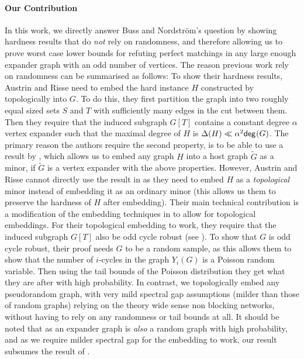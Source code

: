 \documentclass[11pt]{article}
\begin{document}
\paragraph{Our Contribution} In this work, we directly answer Buss and Nordstr{\"o}m's question by showing hardness results that do \emph{not} rely on randomness, and therefore allowing us to prove worst case lower bounds for refuting perfect matchings in any large enough expander graph with an odd number of vertices.
The reason previous work rely on randomness can be summarised as follows:
To show their hardness results, Austrin and Risse need to embed the hard instance $H$ constructed by \citet{buss1999linear} topologically into $G$.
To do this, they first partition the graph into two roughly equal sized sets $S$ and $T$ with sufficiently many edges in the cut between them.
Then they  require that the induced subgraph $G[T]$ contains a constant degree $\alpha$ vertex expander such that the maximal degree of $H$ is $\Delta(H) \ll \alpha^2 \mathsf{deg}_{}(G)$.
The primary reason the authors require the second property, is to be able to use a result by \citet{krivelevich2019completeminorsgraphssparse}, which allows us to embed any graph $H$ into a host graph $\tilde{G}$ as a minor, if $\tilde{G}$ is a vertex expander with the above properties.
However, Austrin and Risse cannot directly use the result in \citep{krivelevich2019completeminorsgraphssparse} as they need to embed $H$ as a \emph{topological} minor instead of embedding it as an ordinary minor (this allows us them to preserve the hardness of $H$ after embedding).
Their main technical contribution is a modification of the embedding techniques in \citep{krivelevich2019completeminorsgraphssparse} to allow for topological embeddings.
For their topological embedding to work, they require that the induced subgraph $G[T]$ also be odd cycle robust (see \citep[Definition 3.2]{Austrin_2022}).
To show that $G$ is odd cycle robust, their proof needs $G$ to be a random sample, as this allows them to show that the number of $i$-cycles in the graph $Y_i(G)$ is a Poisson random variable.
Then using the tail bounds of the Poisson distribution they get what they are after with high probability.
In contrast, we topologically embed any pseudorandom graph, with very mild spectral gap assumptions (milder than those of random graphs)
relying on the theory wide sense non blocking networks, without having to rely on any randomness or tail bounds at all.
It should be noted that as an expander graph is \emph{also} a random graph with high probability, and as we require milder spectral gap for the embedding to work, our result subsumes the result of \citet{Austrin_2022}.
\end{document}
